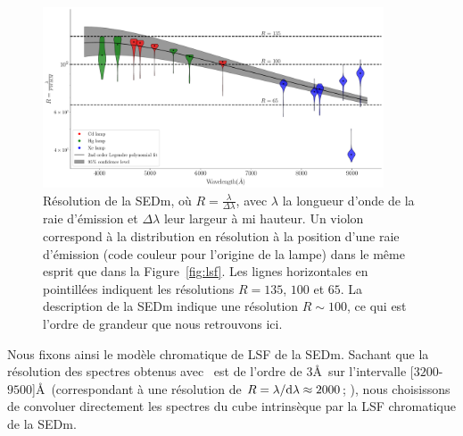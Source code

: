 \documentclass[../main/main.tex]{subfiles}
\begin{document}
\begin{figure}[h!]
  \centering
  \includegraphics[width=0.9\textwidth]{../figures/06_irf/SEDmResolution_wmodel.pdf}
  \caption[Résolution de la SEDm]{Résolution de la SEDm, où
    $R=\frac{\lambda}{\Delta\lambda}$, avec $\lambda$ la longueur d'onde
  de la raie d'émission et $\Delta\lambda$ leur largeur à mi
  hauteur. Un violon correspond à la distribution en résolution à la
  position d'une raie d'émission (code couleur pour l'origine de la
  lampe) dans le même esprit que dans la Figure~\ref{fig:lsf}. Les lignes horizontales en pointillées indiquent les
  résolutions $R=135$, $100$ et $65$. La description de la SEDm
  \citep{SEDM18} indique une résolution $R\sim100$, ce qui est l'ordre
  de grandeur que nous retrouvons ici.}
  \label{fig:resolutionsedm}
\end{figure}




Nous fixons ainsi le modèle chromatique de LSF de la SEDm. Sachant que la résolution
des spectres obtenus avec \cigale\ est de l'ordre de $3$\AA\ sur
l'intervalle [$3200$-$9500$]\AA\ (correspondant à une résolution de
$R=\lambda/\mathrm{d}\lambda\approx2000$; \citet{BCO3}), nous choisissons
de convoluer directement les spectres du cube intrinsèque par la LSF
chromatique de
la SEDm.
\end{document}
